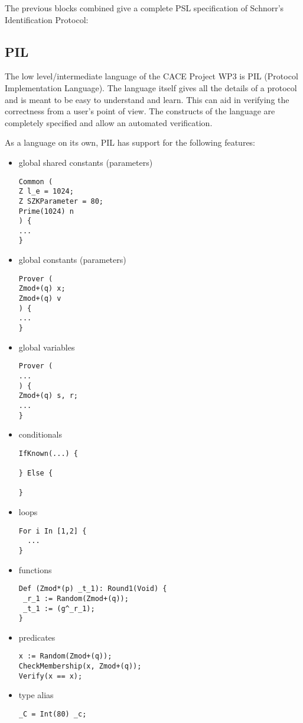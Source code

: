 The previous blocks combined give a complete PSL specification of
Schnorr's Identification Protocol:


\subsection{PIL}
\label{subsec:pil}

The low level/intermediate language of the CACE Project WP3 is PIL
(Protocol Implementation Language). The language itself gives all the
details of a protocol and is meant to be easy to understand and
learn. This can aid in verifying the correctness from a user's point of
view. The constructs of the language are completely specified and
allow an automated verification.

As a language on its own, PIL has support for the following features:
\begin{itemize}
\item global shared constants (parameters)
\begin{lstlisting}[language=PIL]
Common (
Z l_e = 1024;
Z SZKParameter = 80;
Prime(1024) n
) {
...
}
\end{lstlisting}

\item global constants (parameters)
\begin{lstlisting}[language=PIL]
Prover (
Zmod+(q) x;
Zmod+(q) v
) {
...
}
\end{lstlisting}

\item global variables
\begin{lstlisting}[language=PIL]
Prover (
...
) {
Zmod+(q) s, r;
...
}
\end{lstlisting}

\item conditionals
\begin{lstlisting}[language=PIL]
IfKnown(...) {

} Else {

}
\end{lstlisting}

\item loops
\begin{lstlisting}[language=PIL]
For i In [1,2] {
  ...
}
\end{lstlisting}

\item functions
\begin{lstlisting}[language=PIL]
Def (Zmod*(p) _t_1): Round1(Void) {
 _r_1 := Random(Zmod+(q));
 _t_1 := (g^_r_1);
}
\end{lstlisting}

\item predicates
\begin{lstlisting}
x := Random(Zmod+(q));
CheckMembership(x, Zmod+(q));
Verify(x == x);
\end{lstlisting}

\item type alias
\begin{lstlisting}
_C = Int(80) _c;
\end{lstlisting}

\end{itemize}

